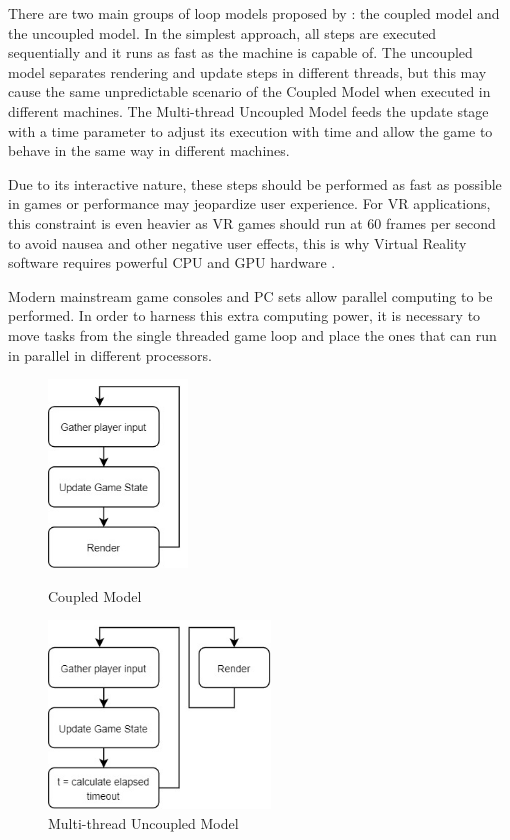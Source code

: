 \documentclass[runningheads]{llncs}
\begin{document}
There are two main groups of loop models proposed by \cite{valente_conci_feijo}: the coupled model and the uncoupled model.
In the simplest approach, all steps are executed sequentially and it runs as fast as the machine is capable of. The uncoupled model separates rendering and update steps in different threads, but this may cause the same unpredictable scenario of the Coupled Model when executed in different machines. The Multi-thread Uncoupled Model feeds the update stage with a time parameter to adjust its execution with time and allow the game to behave in the same way in different machines.

Due to its interactive nature, these steps should be performed as fast as possible in games or performance may jeopardize user experience. For VR applications, this constraint is even heavier as VR games should run at 60 frames per second \cite{pruett_2015} to avoid nausea and other negative user effects, this is why Virtual Reality software requires powerful CPU and GPU hardware \cite{gregory_2019}.

Modern mainstream game consoles and PC sets allow parallel computing to be performed. In order to harness this extra computing power, it is necessary to move tasks from the single threaded game loop and place the ones that can run in parallel in different processors.

\begin{figure}
    \centering
    \begin{minipage}{.5\textwidth}
        \centering
        \includegraphics[height=5cm]{src/hci2020-images/CoupledLoopModel.jpg}
        \caption{Coupled Model}
        \label{fig:coupledModel}
    \end{minipage}%
    \begin{minipage}{.5\textwidth}
        \centering
        \includegraphics[height=5cm]{src/hci2020-images/UncoupledLoopModel.jpg}
        \caption{Multi-thread Uncoupled Model \cite{valente_conci_feijo}}
        \label{fig:uncoupledModel}
    \end{minipage}
\end{figure}
\end{document}
